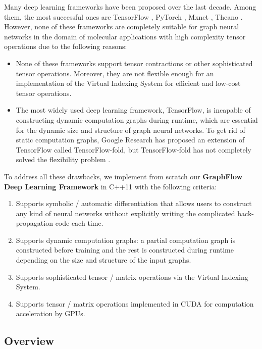 \documentclass[a4paper]{article}
\begin{document}
Many deep learning frameworks have been proposed over the last decade. Among them, the most successful ones are TensorFlow \cite{Google-Research}, PyTorch \cite{PyTorch}, Mxnet \cite{Mxnet}, Theano \cite{Theano}. However, none of these frameworks are completely suitable for graph neural networks in the domain of molecular applications with high complexity tensor operations due to the following reasons:
\begin{itemize}
	\item None of these frameworks support tensor contractions or other sophisticated tensor operations. Moreover, they are not flexible enough for an implementation of the Virtual Indexing System for efficient and low-cost tensor operations.
	\item The most widely used deep learning framework, TensorFlow, is incapable of constructing dynamic computation graphs during runtime, which are essential for the dynamic size and structure of graph neural networks. To get rid of static computation graphs, Google Research has proposed an extension of TensorFlow called TensorFlow-fold, but TensorFlow-fold has not completely solved the flexibility problem \cite{TF-fold}.
\end{itemize}
To address all these drawbacks, we implement from scratch our \textbf{GraphFlow Deep Learning Framework} in C++11 with the following criteria:
\begin{enumerate}
	\item Supports symbolic / automatic differentiation that allows users to construct any kind of neural networks without explicitly writing the complicated back-propagation code each time.
	\item Supports dynamic computation graphs: a partial computation graph is constructed before training and the rest is constructed during runtime depending on the size and structure of the input graphs.
	\item Supports sophisticated tensor / matrix operations via the Virtual Indexing System.
	\item Supports tensor / matrix operations implemented in CUDA for computation acceleration by GPUs.  
\end{enumerate}

\subsection{Overview}
\end{document}
